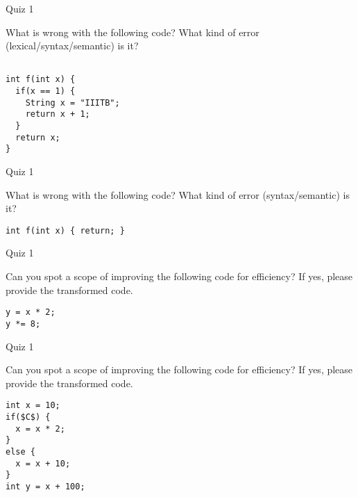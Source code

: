 \documentclass{beamer}
\begin{document}
\begin{frame}[fragile]{Quiz 1}


What is wrong with the following code? What kind of error (lexical/syntax/semantic) is it?\begin{lstlisting}[style=javacode]

int f(int x) {
  if(x == 1) {
    String x = "IIITB";
    return x + 1;
  }
  return x;
}
\end{lstlisting}
\end{frame}


\begin{frame}[fragile]{Quiz 1}


What is wrong with the following code? What kind of error (syntax/semantic) is it?\begin{lstlisting}[style=javacode]
int f(int x) { return; }
\end{lstlisting}
\end{frame}

\begin{frame}[fragile]{Quiz 1}

Can you spot a scope of improving the following code for efficiency? If yes, please provide the transformed code.

\begin{lstlisting}[style=javacode]
y = x * 2;
y *= 8;
\end{lstlisting}
\end{frame}

\begin{frame}[fragile]{Quiz 1}

Can you spot a scope of improving the following code for efficiency? If yes, please provide the transformed code.

\begin{lstlisting}[style=javacode]
int x = 10;
if($C$) {
  x = x * 2;
}
else {
  x = x + 10;
}
int y = x + 100;
\end{lstlisting}
\end{frame}
\end{document}
